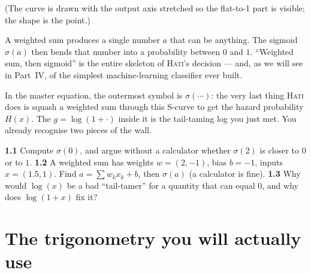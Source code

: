 \documentclass[11pt,oneside]{book}
\begin{document}
\begin{center}
\end{center}
(The curve is drawn with the output axis stretched so the flat-to-1 part is visible;
the shape is the point.)

\begin{keyidea}
A weighted sum produces a single number $a$ that can be anything. The sigmoid
$\sigma(a)$ then bends that number into a probability between $0$ and $1$. ``Weighted
sum, then sigmoid'' is the entire skeleton of \textsc{Hati}'s decision --- and, as
we will see in Part~IV, of the simplest machine-learning classifier ever built.
\end{keyidea}

\begin{hatibox}
In the master equation, the outermost symbol is $\sigma(\cdots)$: the very last thing
\textsc{Hati} does is squash a weighted sum through this S-curve to get the hazard
probability $H(x)$. The $g=\log(1+\cdot)$ inside it is the tail-taming log you just
met. You already recognise two pieces of the wall.
\end{hatibox}

\begin{practice}
\textbf{1.1} Compute $\sigma(0)$, and argue without a calculator whether $\sigma(2)$
is closer to $0$ or to $1$. \quad\textbf{1.2} A weighted sum has weights $w=(2,-1)$,
bias $b=-1$, inputs $x=(1.5,1)$. Find $a=\sum w_kx_k+b$, then $\sigma(a)$ (a calculator
is fine). \quad\textbf{1.3} Why would $\log(x)$ be a bad ``tail-tamer'' for a quantity
that can equal $0$, and why does $\log(1+x)$ fix it?
\end{practice}

\chapter{The trigonometry you will actually use}
\end{document}
